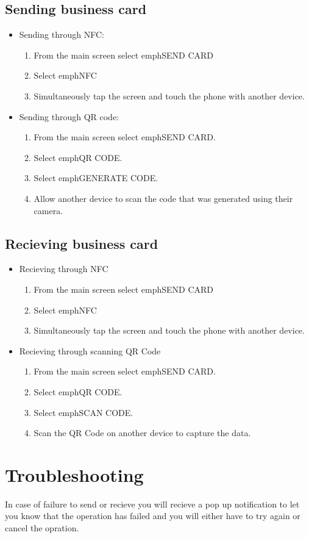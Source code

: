 \documentclass[english]{article}
\begin{document}
		\subsection{Sending business card}
		\begin{itemize}
		\item Sending through NFC:
		\begin{enumerate}
			\item From the main screen select emph{SEND CARD}
			\item Select emph{NFC}
			\item Simultaneously tap the screen and touch the phone with another device.
		\end{enumerate}
		\item Sending through QR code:
		\begin{enumerate}
			\item From the main screen select emph{SEND CARD}.
			\item Select emph{QR CODE}.
			\item Select emph{GENERATE CODE}.
			\item Allow another device to scan the code that was generated using their camera.
		\end{enumerate}
	\end{itemize}

\subsection{Recieving business card}
	\begin{itemize}
		\item Recieving through NFC
		\begin{enumerate}
			\item From the main screen select emph{SEND CARD}
			\item Select emph{NFC}
			\item Simultaneously tap the screen and touch the phone with another device.
		\end{enumerate}
		\item Recieving through scanning QR Code
		\begin{enumerate}
			\item From the main screen select emph{SEND CARD}.
			\item Select emph{QR CODE}.
			\item Select emph{SCAN CODE}.
			\item Scan the QR Code on another device to capture the data.
		\end{enumerate}
	\end{itemize}
	
	\section {Troubleshooting}
		In case of failure to send or recieve you will recieve a pop up notification to let you know that the operation has failed and you will either have to try again or cancel the opration.
	
\end{document}
